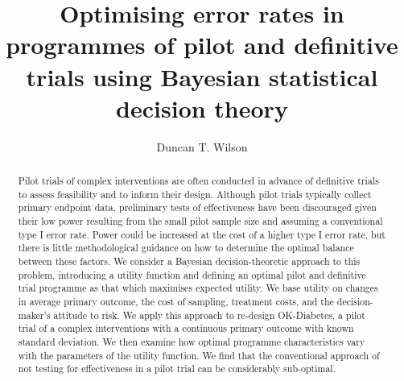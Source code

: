 \documentclass[sagev, Crown]{sagej} %
\begin{document}

\title{Optimising error rates in programmes of pilot and definitive trials using Bayesian statistical decision theory}

\author{Duncan T. Wilson}%



\begin{abstract}
Pilot trials of complex interventions are often conducted in advance of definitive trials to assess feasibility and to inform their design. Although pilot trials typically collect primary endpoint data, preliminary tests of effectiveness have been discouraged given their low power resulting from the small pilot sample size and assuming a conventional type I error rate. Power could be increased at the cost of a higher type I error rate, but there is little methodological guidance on how to determine the optimal balance between these factors. We consider a Bayesian decision-theoretic approach to this problem, introducing a utility function and defining an optimal pilot and definitive trial programme as that which maximises expected utility. We base utility on changes in average primary outcome, the cost of sampling, treatment costs, and the decision-maker's attitude to risk. We apply this approach to re-design OK-Diabetes, a pilot trial of a complex interventions with a continuous primary outcome with known standard deviation. We then examine how optimal programme characteristics vary with the parameters of the utility function. We find that the conventional approach of not testing for effectiveness in a pilot trial can be considerably sub-optimal.
\end{abstract}


\maketitle
\end{document}
